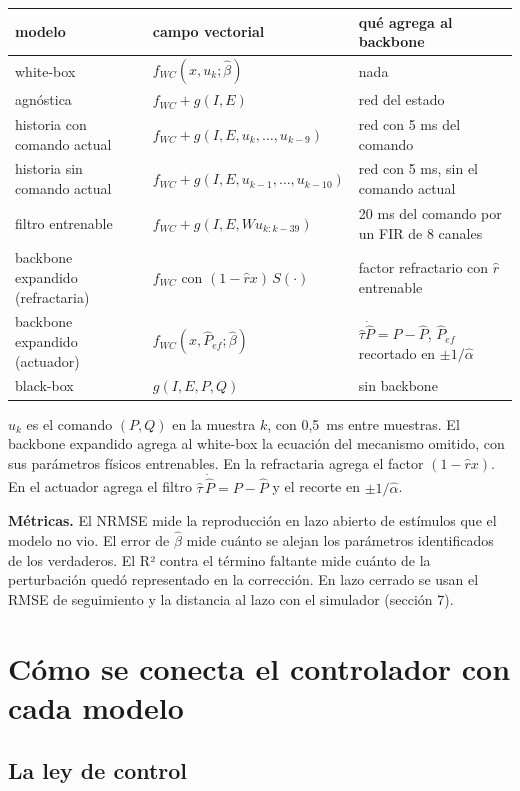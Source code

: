 \documentclass[10pt,a4paper]{article}
\newcommand{\bh}{\hat\beta}
\begin{document}
\begin{center}
\small
\begin{tabular}{@{}lll@{}}
\toprule
modelo & campo vectorial & qué agrega al backbone \\
\midrule
white-box & $f_{WC}(x, u_k; \bh)$ & nada \\
agnóstica & $f_{WC} + g(I, E)$ & red del estado \\
historia con comando actual & $f_{WC} + g(I, E, u_k, \dots, u_{k-9})$ & red con 5 ms del comando \\
historia sin comando actual & $f_{WC} + g(I, E, u_{k-1}, \dots, u_{k-10})$ & red con 5 ms, sin el comando actual \\
filtro entrenable & $f_{WC} + g(I, E, W u_{k:k-39})$ & 20 ms del comando por un FIR de 8 canales \\
backbone expandido (refractaria) & $f_{WC}$ con $(1 - \hat r x)\,S(\cdot)$ & factor refractario con $\hat r$ entrenable \\
backbone expandido (actuador) & $f_{WC}(x, \hat P_{ef}; \bh)$ & $\hat\tau\dot{\hat P} = P - \hat P$, $\hat P_{ef}$ recortado en $\pm 1/\hat\alpha$ \\
black-box & $g(I, E, P, Q)$ & sin backbone \\
\bottomrule
\end{tabular}
\end{center}

$u_k$ es el comando $(P, Q)$ en la muestra $k$, con 0,5~ms entre muestras. El backbone expandido agrega al white-box la ecuación del mecanismo omitido, con sus parámetros físicos entrenables. En la refractaria agrega el factor $(1 - \hat r x)$. En el actuador agrega el filtro $\hat\tau\,\dot{\hat P} = P - \hat P$ y el recorte en $\pm 1/\hat\alpha$.

\textbf{Métricas.} El NRMSE mide la reproducción en lazo abierto de estímulos que el modelo no vio. El error de $\bh$ mide cuánto se alejan los parámetros identificados de los verdaderos. El R² contra el término faltante mide cuánto de la perturbación quedó representado en la corrección. En lazo cerrado se usan el RMSE de seguimiento y la distancia al lazo con el simulador (sección 7).

\section{Cómo se conecta el controlador con cada modelo}

\subsection{La ley de control}
\end{document}
